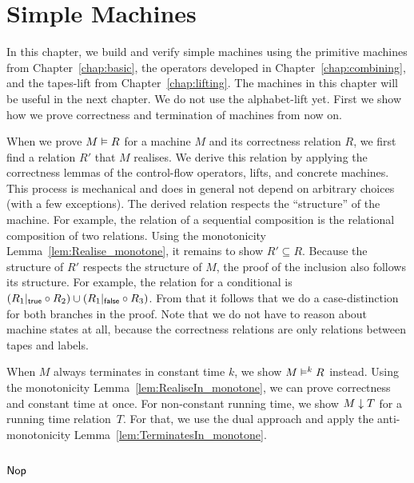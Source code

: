 \chapter{Simple Machines}
\label{chap:compound}

In this chapter, we build and verify simple machines using the primitive machines from Chapter~\ref{chap:basic}, the operators developed in
Chapter~\ref{chap:combining}, and the tapes-lift from Chapter~\ref{chap:lifting}.  The machines in this chapter will be useful in the next chapter.
We do not use the alphabet-lift yet.  First we show how we prove correctness and termination of machines from now on.

When we prove $M \mathrel{\vDash} R$ for a machine $M$ and its correctness relation $R$, we first find a relation $R'$ that $M$ realises.  We derive this
relation by applying the correctness lemmas of the control-flow operators, lifts, and concrete machines.  This process is mechanical and does in
general not depend on arbitrary choices (with a few exceptions).  The derived relation respects the ``structure'' of the machine.  For example, the
relation of a sequential composition is the relational composition of two relations.  Using the monotonicity Lemma~\ref{lem:Realise_monotone}, it
remains to show $R' \subseteq R$.  Because the structure of $R'$ respects the structure of $M$, the proof of the inclusion also follows its structure.
For example, the relation for a conditional is $(R_1 {|}_{\mathsf{true}} \circ R_2) \cup (R_1 {|}_{\mathsf{false}} \circ R_3)$.  From that it follows that we do a
case-distinction for both branches in the proof.  Note that we do not have to reason about machine states at all, because the correctness relations
are only relations between tapes and labels.


When $M$ always terminates in constant time $k$, we show $M \mathrel{\vDash^{k}} R$ instead.  Using the monotonicity Lemma~\ref{lem:RealiseIn_monotone}, we
can prove correctness and constant time at once.  For non-constant running time, we show $M \mathrel{\downarrow} T$ for a running time relation~$T$.  For
that, we use the dual approach and apply the anti-monotonicity Lemma~\ref{lem:TerminatesIn_monotone}.


\section{$\mathsf{Nop}$}
\label{sec:Nop}
%


